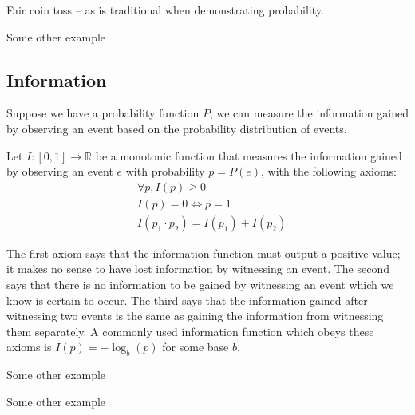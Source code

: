 \begin{myexample}
Fair coin toss -- as is traditional when demonstrating probability.
\end{myexample}

\begin{myexample}
Some other example
\end{myexample}

\subsection{Information}
Suppose we have a probability function $P$, we can measure the information gained by observing an event based on the probability distribution of events.
%  
\begin{mydef}
Let $I: [0,1] \rightarrow \mathbb{R}$ be a monotonic function that measures the information gained by observing an event $e$ with probability $p = P(e)$, with the following axioms:
%
  \begin{align*}
  &\forall p, I(p) \geq 0\\
  & I(p) = 0 \Leftrightarrow p = 1\\
  & I(p_1 \cdot p_2) = I(p_1) + I(p_2)
  \end{align*} 
%
\end{mydef} 
%
The first axiom says that the information function must output a positive value;  it makes no sense to have lost information by witnessing an event.  The second says that there is no information to be gained by witnessing an event which we know is certain to occur.  The third says that the information gained after witnessing two events is the same as gaining the information from witnessing them separately.  A commonly used information function which obeys these axioms is $I(p) = -\log_b(p)$ for some base $b$.
\begin{myexample}
Some other example
\end{myexample}
\begin{myexample}
Some other example
\end{myexample} 
